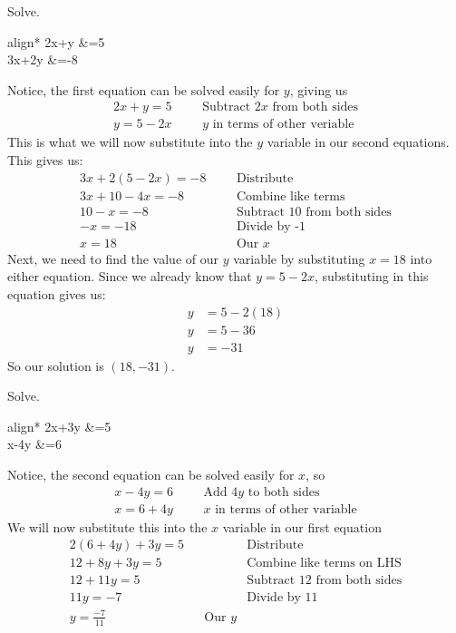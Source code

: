\begin{example}
Solve.
		\begin{empheq}[left={\empheqlbrace}]{align*}
				2x+y &=5\\
				3x+2y &=-8	
		\end{empheq}
\end{example}
%
Notice, the first equation can be solved easily for $y$, giving us
		\begin{align*}
			2x+y =5&    &   &\text{Subtract $2x$ from both sides} \\
		    \boxed{y=5-2x}&	    &   &\text{$y$ in terms of other veriable}
		\end{align*}
This is what we will now substitute into the $y$ variable in our second equations. This gives us:
		\begin{align*}
			3x+2(5-2x) =-8& 	&&\text{Distribute}\\
			3x+10-4x = -8&      &&\text{Combine like terms}\\
			10-x =-8&       	&&\text{Subtract 10 from both sides}\\
			-x = -18&	        &&\text{Divide by -1}\\
			x =18&              &&\text{Our $x$}
		\end{align*}
Next, we need to find the value of our $y$ variable by substituting $x=18$ into either equation. Since we already know that $y=5-2x$, substituting in this equation gives us:
		\begin{align*}
			y&=5-2(18)\\
			y&=5-36 \\
			y&=-31	
		\end{align*}
So our solution is $(18,-31)$.
\begin{example}
Solve.
		\begin{empheq}[left={\empheqlbrace}]{align*}
				2x+3y &=5\\
				x-4y &=6	
		\end{empheq}
\end{example}
%
Notice, the second equation can be solved easily for $x$, so
		\begin{align*}
			x-4y =6&    &   &\text{Add $4y$ to both sides} \\
			\boxed{x=6+4y}&	    &   &\text{$x$ in terms of other variable}
		\end{align*}
We will now substitute this into the $x$ variable in our first equation
		\begin{align*}
			2(6+4y)+3y =5&  	&&\text{Distribute}\\
			12+8y+3y = 5&       &&\text{Combine like terms on LHS}\\
			12+11y =5&	        &&\text{Subtract 12 from both sides}\\
			11y = -7&	        &&\text{Divide by 11}\\
			y =\frac{-7}{11}    &&\text{Our $y$}
		\end{align*}
